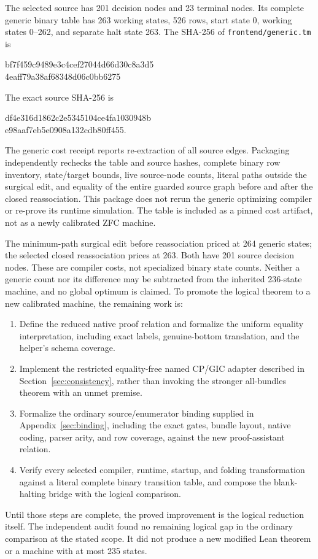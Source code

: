 \documentclass[11pt,letterpaper]{article}
\theoremstyle{definition}\newtheorem{definition}[theorem]{Definition}
\theoremstyle{remark}\newtheorem{remark}[theorem]{Remark}
\newcommand{\file}[1]{\begingroup\small\ttfamily\nolinkurl{#1}\endgroup}
\begin{document}
The selected source has 201 decision nodes and 23 terminal nodes. Its complete generic binary table has 263 working states, 526 rows, start state 0, working states 0--262, and separate halt state 263. The SHA-256 of \file{frontend/generic.tm} is
\begin{center}\small\ttfamily
bf7f459c9489e3c4cef27044d66d30c8a3d5\\
4eaff79a38af68348d06c0bb6275
\end{center}
The exact source SHA-256 is
\begin{center}\small\ttfamily
df4e316d1862c2e5345104ce4fa1030948b\\
e98aaf7eb5e0908a132cdb80ff455.
\end{center}
The generic cost receipt reports re-extraction of all source edges. Packaging independently rechecks the table and source hashes, complete binary row inventory, state/target bounds, live source-node counts, literal paths outside the surgical edit, and equality of the entire guarded source graph before and after the closed reassociation. This package does not rerun the generic optimizing compiler or re-prove its runtime simulation. The table is included as a pinned cost artifact, not as a newly calibrated ZFC machine.

The minimum-path surgical edit before reassociation priced at 264 generic states; the selected closed reassociation prices at 263. Both have 201 source decision nodes. These are compiler costs, not specialized binary state counts. Neither a generic count nor its difference may be subtracted from the inherited 236-state machine, and no global optimum is claimed.
To promote the logical theorem to a new calibrated machine, the remaining work is:
\begin{enumerate}
\item Define the reduced native proof relation and formalize the uniform equality interpretation, including exact labels, genuine-bottom translation, and the helper's schema coverage.
\item Implement the restricted equality-free named CP/GIC adapter described in Section~\ref{sec:consistency}, rather than invoking the stronger all-bundles theorem with an unmet premise.
\item Formalize the ordinary source/enumerator binding supplied in Appendix~\ref{sec:binding}, including the exact gates, bundle layout, native coding, parser arity, and row coverage, against the new proof-assistant relation.
\item Verify every selected compiler, runtime, startup, and folding transformation against a literal complete binary transition table, and compose the blank-halting bridge with the logical comparison.
\end{enumerate}
Until those steps are complete, the proved improvement is the logical reduction itself. The independent audit found no remaining logical gap in the ordinary comparison at the stated scope. It did not produce a new modified Lean theorem or a machine with at most 235 states.
\end{document}
